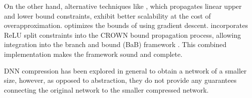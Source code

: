 On the other hand, alternative techniques like \cite{crown, deeppoly}, which
propagates linear upper and lower bound constraints, exhibit better
scalability at the cost of overapproximation. \cite{alpha-crown-bab-fnc} 
optimizes the bounds of \cite{crown} 
using gradient descent. 
\cite{beta-crown} incorporates ReLU split
constraints into the CROWN bound propagation process, allowing integration
into the branch and bound (BaB) framework \cite{bab-fw,bab-piecewise-nn,
bab-lagrangian-decomp}. 
This combined implementation makes the \abcrown framework sound and complete.

DNN compression has been explored \cite{dnn-compression} in general to obtain a
network of a smaller size, however, as opposed to abstraction, they do not
provide any guarantees connecting the original network to the smaller compressed
network. 

